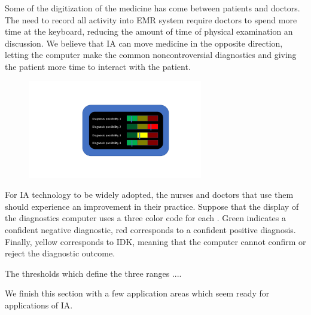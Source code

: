 \documentclass[9pt,twocolumn,twoside]{pnas-new}
\begin{document}
  Some of the digitization of the medicine has come between patients
  and doctors. The need to record all activity into EMR system require
  doctors to spend more time at the keyboard, reducing the amount of
  time of physical examination an discussion. We believe that IA can
  move medicine in the opposite direction, letting the computer make
  the common noncontroversial diagnostics and giving the patient more
  time to interact with the patient.

\begin{figure}[h]
\begin{center}
\includegraphics[width=3in]{figures/RedYellowGreen.pdf}
\end{center}
\end{figure}

  For IA technology to be widely adopted, the nurses and doctors that
  use them should experience an improvement in their practice. Suppose
  that the display of the diagnostics computer uses a three color code
  for each . Green indicates a confident
  negative diagnostic, red corresponds to a confident positive
  diagnosis. Finally, yellow corresponds to IDK, meaning that the
  computer cannot confirm or reject the diagnostic outcome.

  The thresholds which define the three ranges .... 


  
  We finish this section with a few application areas which seem ready
  for applications of IA.
  
\end{document}
